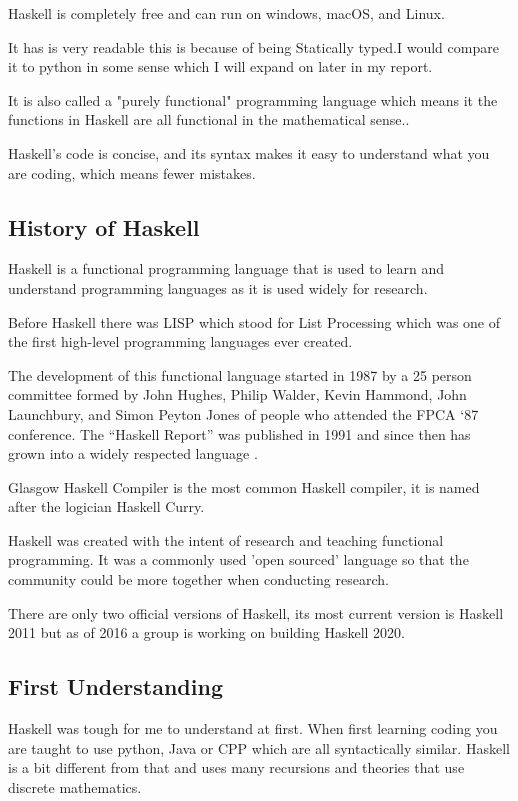 \documentclass{article}
\begin{document}
\medskip\noindent
Haskell is completely free and can run on windows, macOS, and Linux. 

\medskip\noindent
 It has is very readable this is because of being Statically typed.I would compare it to python in some sense which I will expand on later in my report.
 
\medskip\noindent
It is also called a "purely functional" programming language which means it the functions in Haskell are all functional in the mathematical sense.\cite{HHP}. 

\medskip\noindent
Haskell's code is concise, and its syntax makes it easy to understand what you are coding, which means fewer mistakes.

\subsection{History of Haskell}
Haskell is a functional programming language that is used to learn and understand programming languages as it is used widely for research. 

\medskip\noindent
Before Haskell there was LISP which stood for List Processing which was one of the first high-level programming languages ever created.

\medskip\noindent
The development of this functional language started in 1987 by a 25 person committee formed by John Hughes, Philip Walder, Kevin Hammond, John Launchbury, and Simon Peyton Jones of people who attended the FPCA ‘87 conference. The “Haskell Report” was published in 1991 and since then has grown into a widely respected language \cite{HP}. 

\medskip\noindent
Glasgow Haskell Compiler is the most common Haskell compiler, it is named after the logician Haskell Curry.

\medskip\noindent
Haskell was created with the intent of research and teaching functional programming. It was a commonly used 'open sourced' language so that the community could be more together when conducting research. \cite{BHH} 

\medskip\noindent
There are only two official versions of Haskell, its most current version is Haskell 2011 but as of 2016 a group is working on building Haskell 2020.

\subsection{First Understanding}
Haskell was tough for me to understand at first. When first learning coding you are taught to use python, Java or CPP which are all syntactically similar. Haskell is a bit different from that and uses many recursions and theories that use discrete mathematics.
\end{document}
